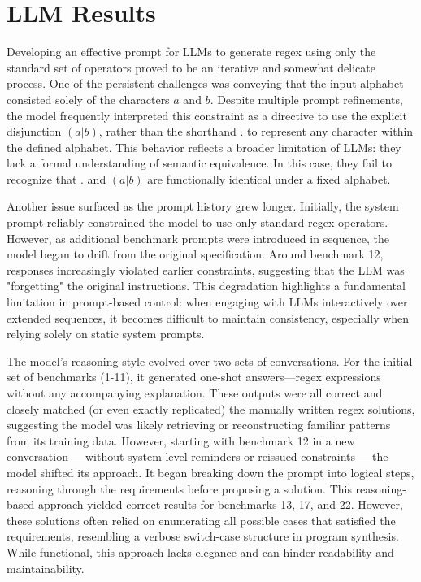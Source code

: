 \section{LLM Results}

\indent\indent Developing an effective prompt for LLMs to generate regex using only the standard set of operators proved to be an iterative and somewhat delicate process. One of the persistent challenges was conveying that the input alphabet consisted solely of the characters $a$ and $b$. Despite multiple prompt refinements, the model frequently interpreted this constraint as a directive to use the explicit disjunction $(a|b)$, rather than the shorthand $.$ to represent any character within the defined alphabet. This behavior reflects a broader limitation of LLMs: they lack a formal understanding of semantic equivalence. In this case, they fail to recognize that $.$ and $(a|b)$ are functionally identical under a fixed alphabet.

\indent\indent Another issue surfaced as the prompt history grew longer. Initially, the system prompt reliably constrained the model to use only standard regex operators. However, as additional benchmark prompts were introduced in sequence, the model began to drift from the original specification. Around benchmark 12, responses increasingly violated earlier constraints, suggesting that the LLM was "forgetting" the original instructions. This degradation highlights a fundamental limitation in prompt-based control: when engaging with LLMs interactively over extended sequences, it becomes difficult to maintain consistency, especially when relying solely on static system prompts.

\indent\indent The model's reasoning style evolved over two sets of conversations. For the initial set of benchmarks (1-11), it generated one-shot answers—regex expressions without any accompanying explanation. These outputs were all correct and closely matched (or even exactly replicated) the manually written regex solutions, suggesting the model was likely retrieving or reconstructing familiar patterns from its training data. However, starting with benchmark 12 in a new conversation--—without system-level reminders or reissued constraints--—the model shifted its approach. It began breaking down the prompt into logical steps, reasoning through the requirements before proposing a solution. This reasoning-based approach yielded correct results for benchmarks 13, 17, and 22. However, these solutions often relied on enumerating all possible cases that satisfied the requirements, resembling a verbose switch-case structure in program synthesis. While functional, this approach lacks elegance and can hinder readability and maintainability.


